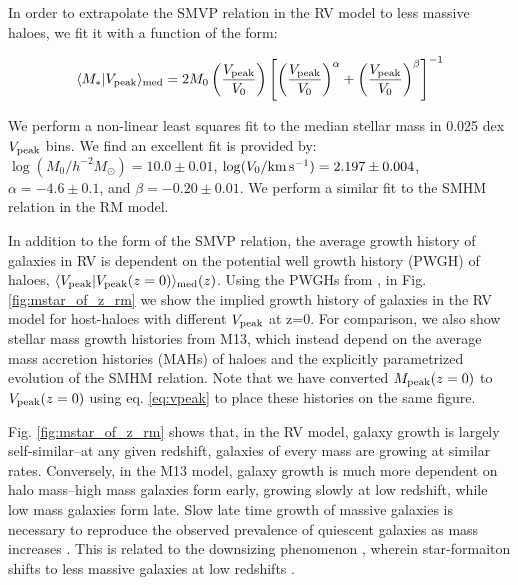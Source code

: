 \documentclass[a4paper,fleqn,usenatbib]{mnras}
\begin{document}
In order to extrapolate the SMVP relation in the RV model to less massive haloes, we fit it with a function of the form:
%
\begin{linenomath}
\begin{equation}
\label{eq:smvp_relation}
\langle M_* | V_{\rm peak} \rangle_{\rm med} = 2M_0\left(\frac{V_{\rm peak}}{V_0}\right)\left[\left(\frac{V_{\rm peak}}{V_0}\right)^{\alpha}+\left(\frac{V_{\rm peak}}{V_0}\right)^{\beta}\right]^{-1}
\end{equation}
\end{linenomath}
%
We perform a non-linear least squares fit to the median stellar mass in 0.025 dex $V_{\rm peak}$ bins.  We find an excellent fit is provided by: $\log(M_0/h^{-2}M_{\odot})=10.0 \pm 0.01$, $\log(V_0/{\rm km}\, {\rm s}^{-1})=2.197 \pm 0.004$, $\alpha=-4.6 \pm 0.1$, and $\beta=-0.20 \pm 0.01$.  We perform a similar fit to the SMHM relation in the RM model.

In addition to the form of the SMVP relation, the average growth history of galaxies in RV is dependent on the potential well growth history (PWGH) of haloes, $\langle V_{\rm peak}| V_{\rm peak}(z=0) \rangle_{\rm med}(z)$.  Using the PWGHs from \citet{Bosch:2014cu}, in Fig. \ref{fig:mstar_of_z_rm} we show the implied growth history of galaxies in the RV model for host-haloes with different $V_{\rm peak}$ at z=0.  For comparison, we also show stellar mass growth histories from M13, which instead depend on the average mass accretion histories (MAHs) of haloes and the explicitly parametrized evolution of the SMHM relation.  Note that we have converted $M_{\rm peak}(z=0)$ to $V_{\rm peak}(z=0)$ using eq. \ref{eq:vpeak} to place these histories on the same figure.  

Fig. \ref{fig:mstar_of_z_rm} shows that, in the RV model, galaxy growth is largely self-similar--at any given redshift, galaxies of every mass are growing at similar rates.  Conversely, in the M13 model, galaxy growth is much more dependent on halo mass--high mass galaxies form early, growing slowly at low redshift, while low mass galaxies form late.  Slow late time growth of massive galaxies is necessary to reproduce the observed prevalence of quiescent galaxies as mass increases \citep[e.g.][]{vandenBosch:2008fv, Wetzel:2012lk}.  This is related to the downsizing phenomenon \citep{Neistein:2006fl}, wherein star-formaiton shifts to less massive galaxies at low redshifts \citep[e.g.][]{Kodama:2004gb, Jimenez:2005gj, Juneau:2005ig, Bell:2005hs, Bundy:2006em}.  
\end{document}
